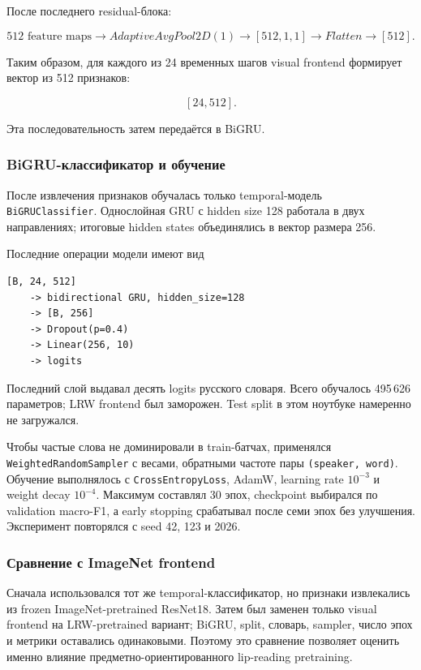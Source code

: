 \documentclass[12pt,a4paper]{article}
\begin{document}
После последнего residual-блока:

\[
512\text{ feature maps}
\rightarrow
AdaptiveAvgPool2D(1)
\rightarrow
[512,1,1]
\rightarrow
Flatten
\rightarrow
[512].
\]

Таким образом, для каждого из 24 временных шагов visual frontend
формирует вектор из 512 признаков:

\[
[24,512].
\]

Эта последовательность затем передаётся в BiGRU.

\fi

\subsubsection{BiGRU-классификатор и обучение}

После извлечения признаков обучалась только temporal-модель
\texttt{BiGRUClassifier}. Однослойная GRU с hidden size 128 работала в двух
направлениях; итоговые hidden states объединялись в вектор размера 256.

Последние операции модели имеют вид

\begin{verbatim}
[B, 24, 512]
    -> bidirectional GRU, hidden_size=128
    -> [B, 256]
    -> Dropout(p=0.4)
    -> Linear(256, 10)
    -> logits
\end{verbatim}

Последний слой выдавал десять logits русского словаря. Всего обучалось
495\,626 параметров; LRW frontend был заморожен. Test split в этом ноутбуке
намеренно не загружался.

Чтобы частые слова не доминировали в train-батчах, применялся
\texttt{WeightedRandomSampler} с весами, обратными частоте пары
\texttt{(speaker, word)}. Обучение выполнялось с \texttt{CrossEntropyLoss},
AdamW, learning rate $10^{-3}$ и weight decay $10^{-4}$. Максимум составлял
30 эпох, checkpoint выбирался по validation macro-F1, а early stopping
срабатывал после семи эпох без улучшения. Эксперимент повторялся с seed 42,
123 и 2026.

\subsubsection{Сравнение с ImageNet frontend}

Сначала использовался тот же temporal-классификатор, но признаки извлекались
из frozen ImageNet-pretrained ResNet18. Затем был заменен только visual
frontend на LRW-pretrained вариант; BiGRU, split, словарь, sampler, число
эпох и метрики оставались одинаковыми. Поэтому это сравнение позволяет
оценить именно влияние предметно-ориентированного lip-reading pretraining.
\end{document}

